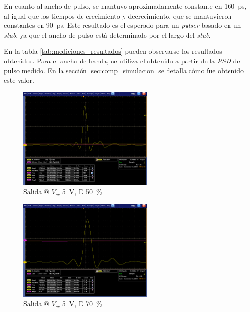 En cuanto al ancho de pulso, se mantuvo aproximadamente constante en
\qty{160}{\pico\second}, al igual que los tiempos de crecimiento y
decrecimiento, que se mantuvieron constantes en \qty{90}{\pico\second}. Este
resultado es el esperado para un \textit{pulser} basado en un \textit{stub}, ya
que el ancho de pulso está determinado por el largo del \textit{stub}.

En la tabla \ref{tab:mediciones_resultados} pueden observarse los resultados
obtenidos. Para el ancho de banda, se utiliza el obtenido a partir de la
\textit{PSD} del pulso medido. En la sección \ref{sec:comp_simulacion} se
detalla cómo fue obtenido este valor.

\begin{figure}
  \centering
    \includegraphics[width=0.6\textwidth]{images/mediciones/vcc_5v_duty_50.png}
    \caption{Salida @ $V_{cc}$ \qty{5}{\volt}, D \qty{50}{\percent} }
    \label{fig:mediciones_5v_50}
\end{figure}

\begin{figure}
  \centering
    \includegraphics[width=0.6\textwidth]{images/mediciones/vcc_5v_duty_70.png}
    \caption{Salida @ $V_{cc}$ \qty{5}{\volt}, D \qty{70}{\percent} }
    \label{fig:mediciones_5v_70}
\end{figure}

